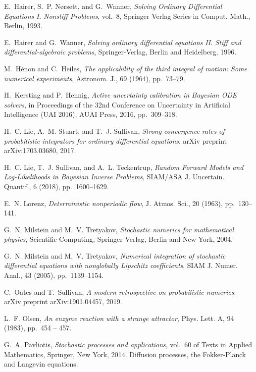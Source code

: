 \documentclass[10pt]{article}
\begin{document}
\begin{thebibliography}{10}
	{\sc E.~Hairer, S.~P. N{\o{}}rsett, and G.~Wanner}, {\em Solving Ordinary
		Differential Equations I. Nonstiff Problems}, vol.~8, Springer Verlag Series
	in Comput. Math., Berlin, 1993.
	
	{\sc E.~Hairer and G.~Wanner}, {\em Solving ordinary differential equations II.
		Stiff and differential-algebraic problems}, Springer-Verlag, Berlin and
	Heidelberg, 1996.
	
	{\sc M.~H\'enon and C.~Heiles}, {\em The applicability of the third integral of
		motion: {S}ome numerical experiments}, Astronom. J., 69 (1964), pp.~73--79.
	
	{\sc H.~Kersting and P.~Hennig}, {\em Active uncertainty calibration in
		{B}ayesian {ODE} solvers}, in Proceedings of the 32nd Conference on
	Uncertainty in Artificial Intelligence (UAI 2016), {AUAI} Press, 2016,
	pp.~309--318.
	
	{\sc H.~C. Lie, A.~M. Stuart, and T.~J. Sullivan}, {\em Strong convergence
		rates of probabilistic integrators for ordinary differential equations}.
	\newblock arXiv preprint arXiv:1703.03680, 2017.
	
	{\sc H.~C. Lie, T.~J. Sullivan, and A.~L. Teckentrup}, {\em Random {F}orward
		{M}odels and {L}og-{L}ikelihoods in {B}ayesian {I}nverse {P}roblems},
	SIAM/ASA J. Uncertain. Quantif., 6 (2018), pp.~1600--1629.
	
	{\sc E.~N. Lorenz}, {\em Deterministic nonperiodic flow}, J. Atmos. Sci., 20
	(1963), pp.~130--141.
	
	{\sc G.~N. Milstein and M.~V. Tretyakov}, {\em Stochastic numerics for
		mathematical physics}, Scientific Computing, Springer-Verlag, Berlin and New
	York, 2004.
	
	{\sc G.~N. Milstein and M.~V. Tretyakov}, {\em Numerical integration of
		stochastic differential equations with nonglobally {L}ipschitz coefficients},
	SIAM J. Numer. Anal., 43 (2005), pp.~1139--1154.
	
	{\sc C.~Oates and T.~Sullivan}, {\em A modern retrospective on probabilistic
		numerics}.
	\newblock arXiv preprint arXiv:1901.04457, 2019.
	
	{\sc L.~F. Olsen}, {\em An enzyme reaction with a strange attractor}, Phys.
	Lett. A, 94 (1983), pp.~454 -- 457.
	
	{\sc G.~A. Pavliotis}, {\em Stochastic processes and applications}, vol.~60 of
	Texts in Applied Mathematics, Springer, New York, 2014.
	\newblock Diffusion processes, the Fokker-Planck and Langevin equations.
	

\end{thebibliography}
\end{document}
